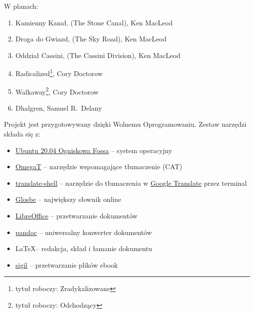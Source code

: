\documentclass[oneside,polish,11pt,sfheadings]{mwbk}
\begin{document}
\begin{center}

\begin{large}W planach:\end{large}\end{center}

\begin{enumerate}
\item Kamienny Kanał, (The Stone Canal), Ken MacLeod
\item Droga do Gwiazd, (The Sky Road), Ken MacLeod
\item Oddział Cassini, (The Cassini Division), Ken MacLeod
\item Radicalized\footnote{tytuł roboczy: Zradykalizowane}, Cory Doctorow
\item Walkaway\footnote{tytuł roboczy: Odchodzący}, Cory Doctorow
\item Dhalgren, Samuel R.~Delany
\end{enumerate}

\newpage

Projekt jest przygotowywany dzięki Wolnemu Oprogramowaniu. Zestaw narzędzi składa się z:
\begin{itemize}
\item \href{https://ubuntu.com/}{Ubuntu 20.04 Ogniskowa Fossa} -- system operacyjny
\item \href{https://omegat.org/}{OmegaT} -- narzędzie wspomagające tłumaczenie (CAT)
\item \href{https://github.com/soimort/translate-shell}{translate-shell} -- narzędzie do tłumaczenia w \href{https://translate.google.pl}{Google Translate} przez terminal 
\item \href{https://glosbe.com/en/pl}{Glosbe} -- największy słownik online
\item \href{https://www.libreoffice.org/}{LibreOffice} -- przetwarzanie dokumentów 
\item \href{http://pandoc.org}{pandoc} -- uniwersalny konwerter dokumentów 
\item \LaTeX -- redakcja, skład i łamanie dokumentu
\item \href{https://sigil-ebook.com/}{sigil} -- przetwarzanie plików ebook
\end{itemize}


\tableofcontents{}
\end{document}
